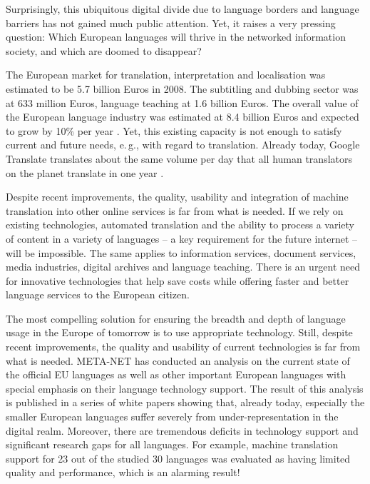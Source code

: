 \documentclass[10pt, plain]{../../metanetpaper}
\begin{document}
\begin{multicols}{2}
Surprisingly, this ubiquitous digital divide due to language borders and language barriers has not gained much public attention. Yet, it raises a very pressing question: Which European languages will thrive in the networked information society, and which are doomed to disappear?

The European market for translation, interpretation and localisation was estimated to be 5.7 billion Euros in 2008. The subtitling and dubbing sector was at 633 million Euros, language teaching at 1.6 billion Euros. The overall value of the European language industry was estimated at 8.4 billion Euros and expected to grow by 10\% per year \cite{EC3}. Yet, this existing capacity is not enough to satisfy current and future needs, e.\,g., with regard to translation. Already today, Google Translate translates about the same volume per day that all human translators on the planet translate in one year \cite{och12}.

Despite recent improvements, the quality, usability and integration of machine translation into other online services is far from what is needed. If we rely on existing technologies, automated translation and the ability to process a variety of content in a variety of languages -- a key requirement for the future internet -- will be impossible. The same applies to information services, document services, media industries, digital archives and language teaching. There is an urgent need for innovative technologies that help save costs while offering faster and better language services to the European citizen.

The most compelling solution for ensuring the breadth and depth of language usage in the Europe of tomorrow is to use appropriate technology. Still, despite recent improvements, the quality and usability of current technologies is far from what is needed. META-NET has conducted an analysis on the current state of the official EU languages as well as other important European languages with special emphasis on their language technology support. The result of this analysis is published in a series of white papers \cite{LWP2012} showing that, already today, especially the smaller European languages suffer severely from under-representation in the digital realm. Moreover, there are tremendous deficits in technology support and significant research gaps for all languages. For example, machine translation support for 23 out of the studied 30 languages was evaluated as having limited quality and performance, which is an alarming result! 


\end{multicols}
\end{document}
